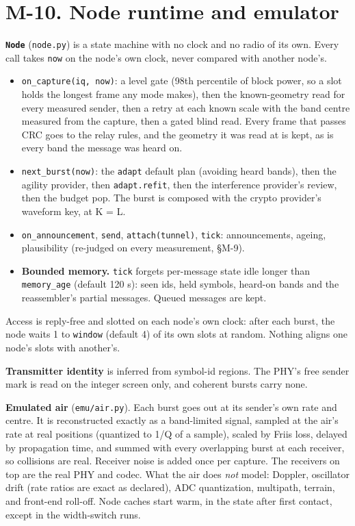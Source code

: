 \documentclass[10pt,letterpaper,twocolumn]{article}
\providecommand{\tightlist}{\setlength{\itemsep}{0pt}\setlength{\parskip}{0pt}}
\begin{document}
\section{M-10. Node runtime and emulator}\label{m-10-node-runtime-and-emulator}

\textbf{\texttt{Node}} (\texttt{node.\allowbreak{}py}) is a state machine with no clock and no radio of its own. Every call takes \texttt{now} on the node's own clock, never compared with another node's.

\begin{itemize}
\tightlist
\item
  \texttt{on\_\allowbreak{}capture(\allowbreak{}iq,\allowbreak{}\ now)\allowbreak{}}: a level gate (98th percentile of block power, so a slot holds the longest frame any mode makes), then the known-geometry read for every measured sender, then a retry at each known scale with the band centre measured from the capture, then a gated blind read. Every frame that passes CRC goes to the relay rules, and the geometry it was read at is kept, as is every band the message was heard on.
\item
  \texttt{next\_\allowbreak{}burst(\allowbreak{}now)\allowbreak{}}: the \texttt{adapt} default plan (avoiding heard bands), then the agility provider, then \texttt{adapt.\allowbreak{}refit}, then the interference provider's review, then the budget pop. The burst is composed with the crypto provider's waveform key, at K = L.
\item
  \texttt{on\_\allowbreak{}announcement}, \texttt{send}, \texttt{attach(\allowbreak{}tunnel)\allowbreak{}}, \texttt{tick}: announcements, ageing, plausibility (re-judged on every measurement, §M-9).
\item
  \textbf{Bounded memory.} \texttt{tick} forgets per-message state idle longer than \texttt{memory\_\allowbreak{}age} (default 120 s): seen ids, held symbols, heard-on bands and the reassembler's partial messages. Queued messages are kept.
\end{itemize}

Access is reply-free and slotted on each node's own clock: after each burst, the node waits 1 to \texttt{window} (default 4) of its own slots at random. Nothing aligns one node's slots with another's.

\textbf{Transmitter identity} is inferred from symbol-id regions. The PHY's free sender mark is read on the integer screen only, and coherent bursts carry none.

\textbf{Emulated air} (\texttt{emu/\allowbreak{}air.\allowbreak{}py}). Each burst goes out at its sender's own rate and centre. It is reconstructed exactly as a band-limited signal, sampled at the air's rate at real positions (quantized to 1/Q of a sample), scaled by Friis loss, delayed by propagation time, and summed with every overlapping burst at each receiver, so collisions are real. Receiver noise is added once per capture. The receivers on top are the real PHY and codec. What the air does \emph{not} model: Doppler, oscillator drift (rate ratios are exact as declared), ADC quantization, multipath, terrain, and front-end roll-off. Node caches start warm, in the state after first contact, except in the width-switch runs.
\end{document}
